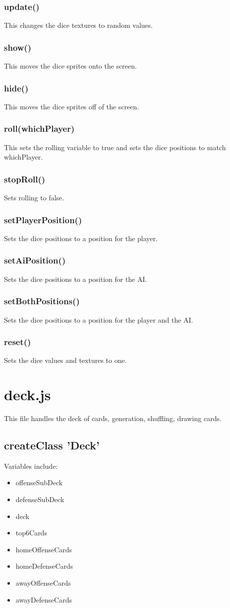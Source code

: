 \documentclass[12pt]{article}
\begin{document}
\subsubsection*{update()}
This changes the dice textures to random values. 
\subsubsection*{show()}
This moves the dice sprites onto the screen.
\subsubsection*{hide()}
This moves the dice sprites off of the screen. 
\subsubsection*{roll(whichPlayer)}
This sets the rolling variable to true and sets the dice positions to 
match whichPlayer. 
\subsubsection*{stopRoll()}
Sets rolling to false. 
\subsubsection*{setPlayerPosition()}
Sets the dice positions to a position for the player. 
\subsubsection*{setAiPosition()}
Sets the dice positions to a position for the AI. 
\subsubsection*{setBothPositions()}
Sets the dice positions to a position for the player and the AI. 
\subsubsection*{reset()}
Sets the dice values and textures to one. 


\section*{deck.js}
This file handles the deck of cards, generation, shuffling, drawing
cards. 
\subsection*{createClass 'Deck'}
Variables include:
\begin{itemize}
\item offenseSubDeck
\item defenseSubDeck
\item deck
\item top6Cards
\item homeOffenseCards
\item homeDefenseCards
\item awayOffenseCards
\item awayDefenseCards
\end{itemize}
\end{document}
